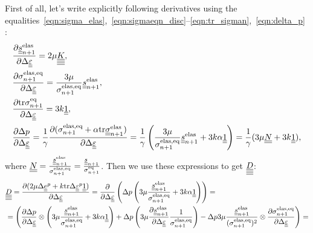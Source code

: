 \documentclass[12pt]{article}
\begin{document}
\begin{appendices}
    First of all, let's write explicitly following derivatives using the equalities~\eqref{eqn:sigma_elas},~\eqref{eqn:sigmaeqn_disc}--\eqref{eqn:tr_sigman},~\eqref{eqn:delta_p} :
    \begin{align}
        & \frac{\partial \underline{\underline{s}}_{n+1}^\text{elas}{}}{\partial \Delta\underline{\underline{\varepsilon}}} = 2\mu \underline{\underline{\underline{\underline{K}}}}, \\
        & \frac{\partial \sigma_{n+1}^\text{elas,eq}{}}{\partial \Delta\underline{\underline{\varepsilon}}} = \frac{3\mu}{\sigma_{n+1}^\text{elas,eq}}\underline{\underline{s}}_{n+1}^\text{elas}, \\
        & \frac{\partial\mathrm{tr}\sigma_{n+1}^\text{eq}}{\partial\Delta\underline{\underline{\varepsilon}}} = 3k\underline{\underline{1}}, \\
        & \frac{\partial\Delta p}{\partial\Delta\underline{\underline{\varepsilon}}} = \frac{1}{\gamma} \frac{\partial(\sigma_{n+1}^\text{elas,eq} + \alpha \mathrm{tr} \underline{\underline{\sigma}}_{n+1}^{\text{elas}})}{\partial\Delta\underline{\underline{\varepsilon}}} = \frac{1}{\gamma} \left( \frac{3\mu}{\sigma_{n+1}^\text{elas,eq}}\underline{\underline{s}}_{n+1}^\text{elas} + 3k\alpha\underline{\underline{1}} \right) = \frac{1}{\gamma}(3\mu \underline{\underline{N}} + 3k\underline{\underline{1}}),
    \end{align}
    where $\underline{\underline{N}} = \frac{\underline{\underline{s}}^\text{elas}_{n+1}}{\sigma_{n+1}^\text{elas,eq}} = \frac{\underline{\underline{s}}_{n+1}}{\sigma_{n+1}^\text{eq}}$.
    Then we use these expressions to get $\underline{\underline{\underline{\underline{D}}}}$:
    \begin{align*}
        & \uuuuD = \frac{\partial (2\mu\Delta\uue^p + k\mtr\Delta\uueps^p\uuUnit)}{\partial\Delta\uueps} = \frac{\partial }{\partial \Delta\uueps} \left( \Delta p \left( 3\mu \frac{\uusnelas}{\sigmaeqnelas} + 3k\alpha \uuUnit  \right) \right) = \\
        & = \left( \frac{\partial\Delta p}{\partial\Delta\uueps} \otimes \left( 3\mu\frac{\uusnelas}{\sigmaeqnelas} + 3k\alpha \uuUnit \right) + \Delta p \left(3\mu\frac{\partial\uusnelas}{\partial\Delta\uueps}\frac{1}{\sigmaeqnelas} \right) - \Delta p 3\mu\frac{\uusnelas}{(\sigmaeqnelas)^2} \otimes \frac{\partial\sigmaeqnelas}{\partial\Delta\uueps}\right) = \\

\end{align*}
\end{appendices}
\end{document}
